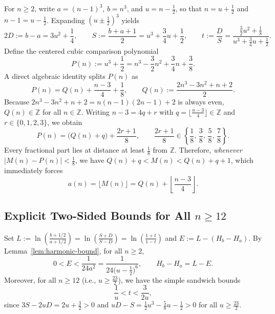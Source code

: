 \documentclass[11pt,a4paper]{article}
\theoremstyle{remark}
\begin{document}
For $n \ge 2$, write $a = (n-1)^3$, $b = n^3$, and $u = n - \frac{1}{2}$, so that $n = u + \frac{1}{2}$ and $n - 1 = u - \frac{1}{2}$. Expanding $(u \pm \frac{1}{2})^3$ yields
\[
  2D := b - a = 3u^2 + \frac{1}{4}, \qquad S := \frac{b + a + 1}{2} = u^3 + \frac{3}{4}u + \frac{1}{2}, \qquad t := \frac{D}{S} = \frac{\frac{3}{2}u^2 + \frac{1}{8}}{u^3 + \frac{3}{4}u + \frac{1}{2}}.
\]
Define the centered cubic comparison polynomial
\[
  P(n) := u^3 + \frac{1}{2} = n^3 - \frac{3}{2}n^2 + \frac{3}{4}n + \frac{3}{8}.
\]
A direct algebraic identity splits $P(n)$ as
\begin{equation}\label{eq:P-split}
  P(n) = Q(n) + \frac{n - 3}{4} + \frac{1}{8}, \qquad Q(n) := \frac{2n^3 - 3n^2 + n + 2}{2}.
\end{equation}
Because $2n^3 - 3n^2 + n + 2 = n(n-1)(2n-1) + 2$ is always even, $Q(n) \in \mathbb{Z}$ for all $n \in \mathbb{Z}$. Writing $n - 3 = 4q + r$ with $q = \lfloor \frac{n-3}{4} \rfloor \in \mathbb{Z}$ and $r \in \{0, 1, 2, 3\}$, we obtain
\[
  P(n) = \big(Q(n) + q\big) + \frac{2r + 1}{8}, \qquad \frac{2r + 1}{8} \in \left\{\frac{1}{8},\, \frac{3}{8},\, \frac{5}{8},\, \frac{7}{8}\right\}.
\]
Every fractional part lies at distance at least $\frac{1}{8}$ from $\mathbb{Z}$. Therefore, \emph{whenever $|M(n) - P(n)| < \frac{1}{8}$}, we have $Q(n) + q < M(n) < Q(n) + q + 1$, which immediately forces
\[
  a(n) = \lfloor M(n) \rfloor = Q(n) + \left\lfloor \frac{n - 3}{4} \right\rfloor.
\]

\subsection{Explicit Two-Sided Bounds for All $n \ge 12$}

Set $L := \ln\!\left(\frac{b + 1/2}{a + 1/2}\right) = \ln\!\left(\frac{S + D}{S - D}\right) = \ln\!\left(\frac{1 + t}{1 - t}\right)$ and $E := L - (H_b - H_a)$. By Lemma~\ref{lem:harmonic-bound}, for all $n \ge 2$,
\begin{equation}\label{eq:L-E}
  0 < E < \frac{1}{24a^2} = \frac{1}{24\big(u - \frac{1}{2}\big)^6}, \qquad H_b - H_a = L - E.
\end{equation}
Moreover, for all $n \ge 12$ (i.e., $u \ge \frac{23}{2}$), we have the simple sandwich bounds
\begin{equation}\label{eq:t-bounds}
  \frac{1}{u} < t < \frac{3}{2u},
\end{equation}
since $3S - 2uD = 2u + \frac{3}{2} > 0$ and $uD - S = \frac{1}{2}u^3 - \frac{5}{8}u - \frac{1}{2} > 0$ for all $u \ge \frac{23}{2}$.
\end{document}
